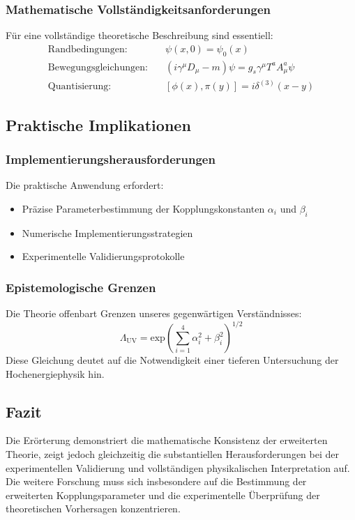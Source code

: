 \documentclass{article}
\begin{document}
\subsubsection{Mathematische Vollständigkeitsanforderungen}
Für eine vollständige theoretische Beschreibung sind essentiell:
\begin{equation}
	\begin{aligned}
		\text{Randbedingungen:} & \quad \psi(x,0) = \psi_0(x) \\
		\text{Bewegungsgleichungen:} & \quad (i\gamma^\mu D_\mu - m)\psi = g_s\gamma^\mu T^a A_\mu^a\psi \\
		\text{Quantisierung:} & \quad [\phi(x),\pi(y)] = i\delta^{(3)}(x-y)
	\end{aligned}
\end{equation}

\subsection{Praktische Implikationen}

\subsubsection{Implementierungsherausforderungen}
Die praktische Anwendung erfordert:
\begin{itemize}
	\item Präzise Parameterbestimmung der Kopplungskonstanten $\alpha_i$ und $\beta_i$
	\item Numerische Implementierungsstrategien
	\item Experimentelle Validierungsprotokolle
\end{itemize}

\subsubsection{Epistemologische Grenzen}
Die Theorie offenbart Grenzen unseres gegenwärtigen Verständnisses:
\begin{equation}
	\Lambda_\text{UV} = \text{exp}\left(\sum_{i=1}^4 \alpha_i^2 + \beta_i^2\right)^{1/2}
\end{equation}
Diese Gleichung deutet auf die Notwendigkeit einer tieferen Untersuchung der Hochenergiephysik hin.

\subsection{Fazit}
Die Erörterung demonstriert die mathematische Konsistenz der erweiterten Theorie, zeigt jedoch gleichzeitig die substantiellen Herausforderungen bei der experimentellen Validierung und vollständigen physikalischen Interpretation auf. Die weitere Forschung muss sich insbesondere auf die Bestimmung der erweiterten Kopplungsparameter und die experimentelle Überprüfung der theoretischen Vorhersagen konzentrieren.
\end{document}
